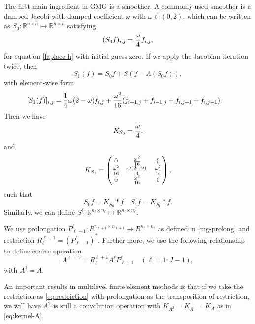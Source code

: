 The first main ingredient in GMG is a smoother.  A commonly used smoother is a
damped Jacobi with damped coefficient $\omega$ with $\omega \in (0,2)$,  which can be written as $S_{0}:\mathbb R^{n\times n}\mapsto
\mathbb R^{n\times n}$ satisfying
\begin{equation}
\label{jacobi1}
(S_{0}f)_{i,j}={\omega\over 4}f_{i,j},
\end{equation}
for equation \eqref{laplace-h} with initial guess zero.
If we apply the Jacobian iteration twice, then
$$
S_1(f) = S_{0} f + S(f - A(S_{0}f)),
$$
with element-wise form
\begin{equation} 
\begin{aligned}
\label{jacobi2}
[S_1(f)]_{i,j} &={1\over 4}\omega(2-\omega)f_{i,j} + {\omega^2\over 16}(f_{i+1,j}+f_{i-1,j}+f_{i,j+1}+f_{i,j-1}).
\end{aligned}
\end{equation}
Then we have 
\begin{equation}\label{eq:kernel-S}
K_{S_{0}} = {\omega \over 4},
\end{equation}
and 
\begin{equation}\label{eq:kernel-S2}
K_{S_1} = \begin{pmatrix}
0 & \frac{\omega^2}{16} & 0 \\
\frac{\omega^2}{16} & {\omega(2-\omega) \over 4} & \frac{\omega^2}{16}  \\
0 & \frac{\omega^2}{16}  & 0
\end{pmatrix},
\end{equation}
such that 
\begin{equation}\label{eq:convS}
S_{0}f = K_{S_{0}} \ast f \quad S_1 f = K_{S_1} \ast f.
\end{equation}
Similarly, we can define 
$S^{\ell}: \mathbb{R}^{n_\ell \times n_\ell} \mapsto \mathbb{R}^{n_\ell \times n_\ell}$.

We use prolongation $P_{\ell+1}^\ell: R^{n_{\ell+1}\times n_{\ell+1}}\mapsto R^{n_{\ell}\times n_{\ell}}$
as defined in \eqref{mg-prolong} and restriction $R_{\ell}^{\ell+1} = (P_{\ell+1}^{\ell})^T$. Further more,
we use the following relationship to define coarse operation
\begin{equation}\label{eq:def_coarse}
A^{\ell+1}=R_{\ell}^{\ell+1} A^{\ell}P_{\ell+1}^{\ell} \quad (\ell = 1:J-1),
\end{equation}
with $A^1 = A$. 



An important results in multilevel finite element methods is that 
if we take the restriction as \eqref{eq:restriction} with prolongation as 
the transposition of restriction, we will have $A^2$ is still a convolution operation 
with $K_{A^2} = K_{A^1} = K_A$ as in \eqref{eq:kernel-A}. 



